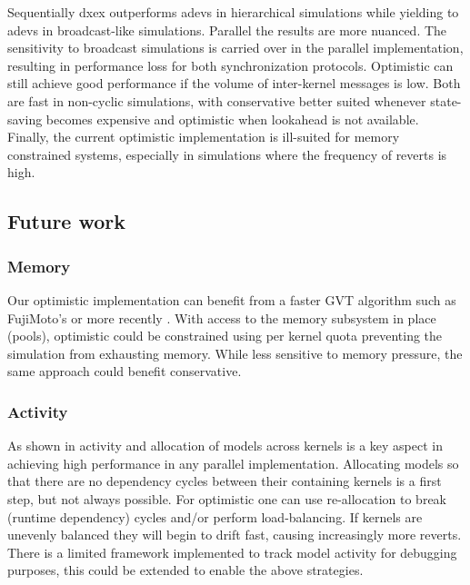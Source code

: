 Sequentially dxex outperforms adevs in hierarchical simulations while yielding to adevs in broadcast-like simulations. 
Parallel the results are more nuanced. The sensitivity to broadcast simulations is carried over in the parallel implementation, resulting in performance loss for both synchronization protocols. Optimistic can still achieve good performance if the volume of inter-kernel messages is low. Both  are fast in non-cyclic simulations, with conservative better suited whenever state-saving becomes expensive and optimistic when lookahead is not available.\\
Finally, the current optimistic implementation is ill-suited for memory constrained systems, especially in simulations where the frequency of reverts is high.
\subsection{Future work}
\subsubsection{Memory}
Our optimistic implementation can benefit from a faster GVT algorithm such as FujiMoto's \cite{Fujimoto:1997:CGV:268403.268404} or more recently \cite{Bauer:2005:SND:1069810.1070159}. 
With access to the memory subsystem in place (pools), optimistic could be constrained using per kernel quota preventing the simulation from exhausting memory. While less sensitive to memory pressure, the same approach could benefit conservative.
\subsubsection{Activity}
As shown in \cite{PythonPDEVS_ACTIMS} activity and allocation of models across kernels is a key aspect in achieving high performance in any parallel implementation. Allocating models so that there are no dependency cycles between their containing kernels is a first step, but not always possible. For optimistic one can use re-allocation to break (runtime dependency) cycles and/or perform load-balancing. If kernels are unevenly balanced they will begin to drift fast, causing increasingly more reverts. There is a limited framework implemented to track model activity for debugging purposes, this could be extended to enable the above strategies.
